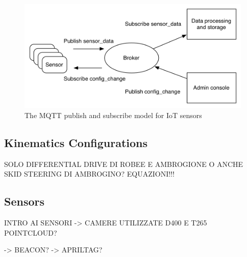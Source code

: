 \begin{figure}[H]
    \centering
    \includegraphics[scale = 0.8]{Images/Chapter 3/mqtt.png}
    \caption{The MQTT publish and subscribe model for IoT sensors}
    \label{fig:mqtt}
\end{figure}
\subsection{Kinematics Configurations}
    SOLO DIFFERENTIAL DRIVE DI ROBEE E AMBROGIONE O ANCHE SKID STEERING DI AMBROGINO?
    EQUAZIONI!!!

\subsection{Sensors}
INTRO AI SENSORI 
-> CAMERE UTILIZZATE D400 E T265
\newpage
POINTCLOUD?

\newpage
-> BEACON?
-> APRILTAG?
